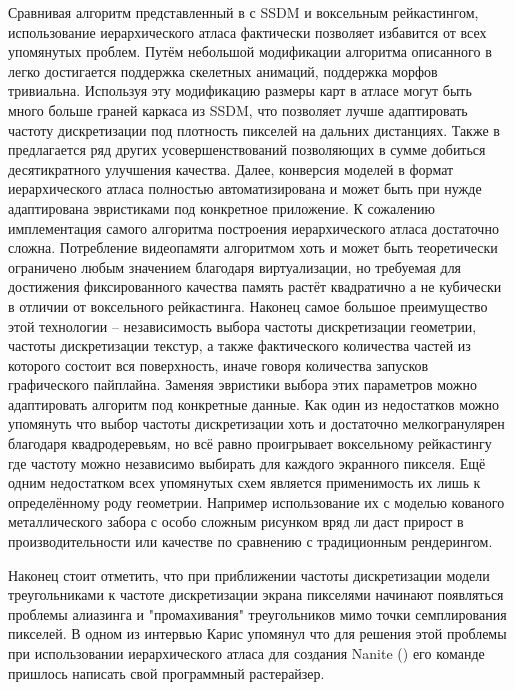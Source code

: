\documentclass[12pt]{extarticle}
\begin{document}
Сравнивая алгоритм представленный в \cite{niski2007multi} с SSDM и воксельным рейкастингом, использование иерархического атласа фактически позволяет избавится от всех упомянутых проблем. Путём небольшой модификации алгоритма описанного в \cite{feng2010feature} легко достигается поддержка скелетных анимаций, поддержка морфов тривиальна. Используя эту модификацию размеры карт в атласе могут быть много больше граней каркаса из SSDM, что позволяет лучше адаптировать частоту дискретизации под плотность пикселей на дальних дистанциях. Также в \cite{feng2010feature} предлагается ряд других усовершенствований позволяющих в сумме добиться десятикратного улучшения качества. Далее, конверсия моделей в формат иерархического атласа полностью автоматизирована и может быть при нужде адаптирована эвристиками под конкретное приложение. К сожалению имплементация самого алгоритма построения иерархического атласа достаточно сложна. Потребление видеопамяти алгоритмом хоть и может быть теоретически ограничено любым значением благодаря виртуализации, но требуемая для достижения фиксированного качества память растёт квадратично а не кубически в отличии от воксельного рейкастинга. Наконец самое большое преимущество этой технологии -- независимость выбора частоты дискретизации геометрии, частоты дискретизации текстур, а также фактического количества частей из которого состоит вся поверхность, иначе говоря количества запусков графического пайплайна. Заменяя эвристики выбора этих параметров можно адаптировать алгоритм под конкретные данные. Как один из недостатков можно упомянуть что выбор частоты дискретизации хоть и достаточно мелкогранулярен благодаря квадродеревьям, но всё равно проигрывает воксельному рейкастингу где частоту можно независимо выбирать для каждого экранного пикселя. Ещё одним недостатком всех упомянутых схем является применимость их лишь к определённому роду геометрии. Например использование их с моделью кованого металлического забора с особо сложным рисунком вряд ли даст прирост в производительности или качестве по сравнению с традиционным рендерингом.

Наконец стоит отметить, что при приближении частоты дискретизации модели треугольниками к частоте дискретизации экрана пикселями начинают появляться проблемы алиазинга и "промахивания" треугольников мимо точки семплирования пикселей. В одном из интервью Карис упомянул что для решения этой проблемы при использовании иерархического атласа для создания Nanite (\cite{nanite}) его команде пришлось написать свой программный растерайзер.
\end{document}
